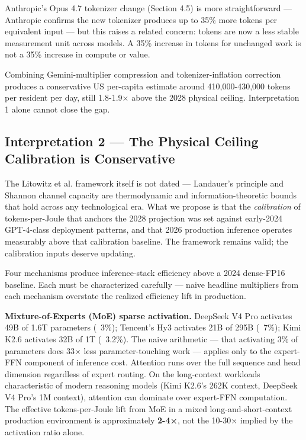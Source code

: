 \documentclass[11pt,a4paper]{article}
\begin{document}
Anthropic's Opus 4.7 tokenizer change (Section 4.5) is more straightforward --- Anthropic confirms the new tokenizer produces up to 35\% more tokens per equivalent input --- but this raises a related concern: tokens are now a less stable measurement unit across models. A 35\% increase in tokens for unchanged work is not a 35\% increase in compute or value.

Combining Gemini-multiplier compression and tokenizer-inflation correction produces a conservative US per-capita estimate around 410,000-430,000 tokens per resident per day, still 1.8-1.9× above the 2028 physical ceiling. Interpretation 1 alone cannot close the gap.

\subsection{Interpretation 2 --- The Physical Ceiling Calibration is Conservative}

The Litowitz et al. framework itself is not dated --- Landauer's principle and Shannon channel capacity are thermodynamic and information-theoretic bounds that hold across any technological era. What we propose is that the \emph{calibration} of tokens-per-Joule that anchors the 2028 projection was set against early-2024 GPT-4-class deployment patterns, and that 2026 production inference operates measurably above that calibration baseline. The framework remains valid; the calibration inputs deserve updating.

Four mechanisms produce inference-stack efficiency above a 2024 dense-FP16 baseline. Each must be characterized carefully --- naive headline multipliers from each mechanism overstate the realized efficiency lift in production.

\textbf{Mixture-of-Experts (MoE) sparse activation.} DeepSeek V4 Pro activates 49B of 1.6T parameters (~3\%); Tencent's Hy3 activates 21B of 295B (~7\%); Kimi K2.6 activates 32B of 1T (~3.2\%). The naive arithmetic --- that activating 3\% of parameters does 33× less parameter-touching work --- applies only to the expert-FFN component of inference cost. Attention runs over the full sequence and head dimension regardless of expert routing. On the long-context workloads characteristic of modern reasoning models (Kimi K2.6's 262K context, DeepSeek V4 Pro's 1M context), attention can dominate over expert-FFN computation. The effective tokens-per-Joule lift from MoE in a mixed long-and-short-context production environment is approximately \textbf{2-4×}, not the 10-30× implied by the activation ratio alone.
\end{document}
